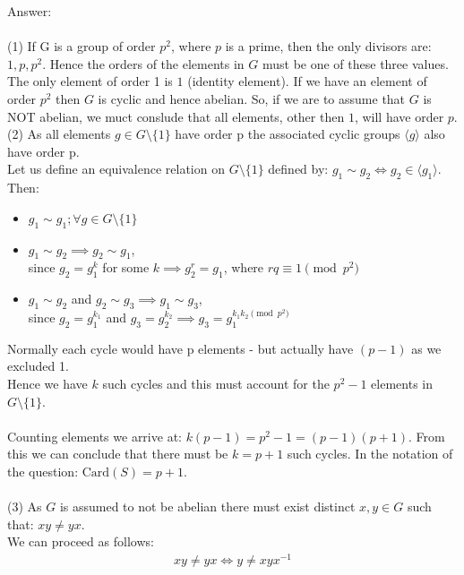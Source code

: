 \documentclass[12pt,a4paper]{article}
\begin{document}
\vspace{1cm}
\noindent
Answer:\\
\\
(1) If G is a group of order $p^2$, where $p$ is a prime, then the only divisors are: $1, p, p^2$.
Hence the orders of the elements in $G$ must be one of these three values.\\
The only element of order 1 is $1$ (identity element).  If we have an element of order $p^2$ then $G$ is cyclic and
hence abelian.  So, if we are to assume that $G$ is NOT abelian, we muct conslude that all elements, other
then $1$, will have order $p$.\\

\newpage
\noindent
(2) As all elements $g \in G \setminus \{1\}$ have order p the associated cyclic groups $\langle g \rangle$ also have order p.\\
Let us define an equivalence relation on $G \setminus \{1\}$ defined by: $g_1 \sim g_2 \iff g_2 \in \langle g_1 \rangle$.\\
Then:
\begin{itemize}
  \item $g_1 \sim g_1; \forall g \in G \setminus \{1\}$
  \item $g_1 \sim g_2 \implies g_2 \sim g_1$, \\
   since $g_2 = g_1^k$ for some $k \implies g_2^r=g_1$, where $rq \equiv 1 \pmod{p^2}$ 
  \item $g_1 \sim g_2$ and $g_2 \sim g_3 \implies g_1 \sim g_3$, \\
  since $g_2 = g_1^{k_1}$ and $g_3 = g_2^{k_2} \implies g_3 = g_1^{k_1 k_2 \pmod{p^2}}$
\end{itemize}
Normally each cycle would have p elements - but actually have $(p-1)$ as we excluded 1.\\
Hence we have $k$ such cycles and this must account for the $p^2-1$ elements in $G \setminus \{1\}$.\\
\\
Counting elements we arrive at: $k(p-1) = p^2-1 = (p-1)(p+1)$.  From this we can conclude that there must
be $k=p+1$ such cycles.  In the notation of the question: $\text{Card}(S)=p+1$.\\
\\
(3) As $G$ is assumed to not be abelian there must exist distinct $x, y \in G$ such that: $xy \ne yx$.\\
We can proceed as follows:
\begin{align*}
    xy \ne yx \iff y \ne xyx^{-1}
\end{align*}
\end{document}
